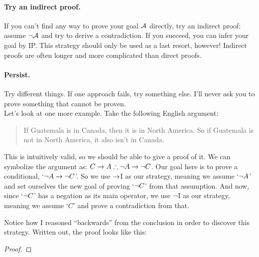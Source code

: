 \paragraph{Try an indirect proof.}
If you can't find any way to prove your goal $\mathcal{A}$ directly, try an indirect proof: assume $\neg \mathcal{A}$ and try to derive a contradiction.  If you succeed, you can infer your goal  by IP.  This strategy should only be used as a last resort, however!  Indirect proofs are often longer and more complicated than direct proofs.
\paragraph{Persist.}
Try different things. If one approach fails, try something else.  I'll never ask you to prove something that cannot be proven.\\


Let's look at one more example.  Take the following English argument:
\begin{quote}
If Guatemala is in Canada, then it is in North America. So if Guatemala is not in North America, it also isn't in Canada.
\end{quote}
This is intuitively valid, so we should be able to give a proof of it.  We can symbolize the argument as: $C \rightarrow A \therefore \neg A \rightarrow \neg C$.	Our goal here is to prove a conditional, `$\neg A \rightarrow \neg C$'.  So we use $\rightarrow$I as our strategy, meaning we assume `$\neg A$' and set ourselves the new goal of proving `$\neg C$' from that assumption.  And now, since `$\neg C$' has a negation as its main operator, we use $\neg$I as our strategy, meaning we assume `$C$' and prove a contradiction from that.  

Notice how I reasoned ``backwards'' from the conclusion in order to discover this strategy.  Written out, the proof looks like this:

	
\begin{proof}
\open
	\open
		 
		 
	\close
	 
\close
{} 
\end{proof}	
	
	

